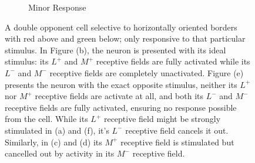 \documentclass[journal,onecolumn]{IEEEtran}
\begin{document}
\begin{figure}[H]
\begin{subfigure}{0.2\textwidth}
        \caption{Minor Response}
    \end{subfigure}
    \caption{A double opponent cell selective to horizontally oriented borders with red above and green below; only responsive to that particular stimulus. In Figure (b), the neuron is presented with its ideal stimulus: its $L^+$ and $M^+$ receptive fields are fully activated while its $L^-$ and $M^-$ receptive fields are completely unactivated. Figure (e) presents the neuron with the exact opposite stimulus, neither its $L^+$ nor $M^+$ receptive fields are activate at all, and both its $L^-$ and $M^-$ receptive fields are fully activated, ensuring no response possible from the cell. While its $L^+$ receptive field might be strongly stimulated in (a) and (f), it's $L^-$ receptive field cancels it out. Similarly, in (c) and (d) its $M^+$ receptive field is stimulated but cancelled out by activity in its $M^-$ receptive field.}
\end{figure}
\end{document}
